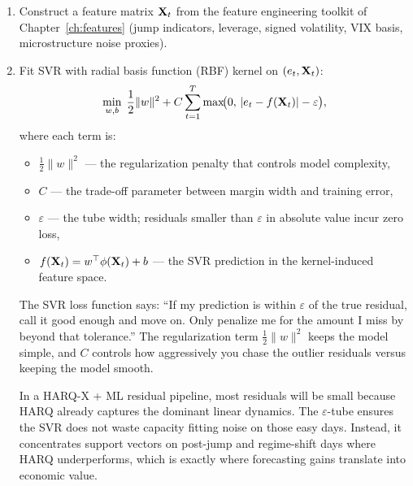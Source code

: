 \begin{enumerate}
  \item Construct a feature matrix $\mathbf{X}_t$ from the feature engineering
        toolkit of Chapter~\ref{ch:features} (jump indicators, leverage,
        signed volatility, VIX basis, microstructure noise proxies).
  \item Fit SVR with radial basis function (RBF) kernel on $(e_t, \mathbf{X}_t)$:
        \begin{equation}\label{eq:svr-loss}
          \min_{w,b}\;\frac{1}{2}\|w\|^2
            + C\sum_{t=1}^{T}\max\!\bigl(0,\,|e_t - f(\mathbf{X}_t)| - \varepsilon\bigr),
        \end{equation}
        where each term is:
        \begin{itemize}
          \item $\frac{1}{2}\|w\|^2$ --- the regularization penalty that
                controls model complexity,
          \item $C$ --- the trade-off parameter between margin width and
                training error,
          \item $\varepsilon$ --- the tube width; residuals smaller than
                $\varepsilon$ in absolute value incur zero loss,
          \item $f(\mathbf{X}_t) = w^\top \phi(\mathbf{X}_t) + b$ --- the SVR prediction
                in the kernel-induced feature space.
        \end{itemize}

        \begin{intuition}
        The SVR loss function says: ``If my prediction is within
        $\varepsilon$ of the true residual, call it good enough and move
        on.  Only penalize me for the amount I miss by beyond that
        tolerance.''  The regularization term $\frac{1}{2}\|w\|^2$ keeps
        the model simple, and $C$ controls how aggressively you chase
        the outlier residuals versus keeping the model smooth.
        \end{intuition}

        \begin{projectconnection}
        In a HARQ-X + ML residual pipeline, most residuals will be small
        because HARQ already captures the dominant linear dynamics.  The
        $\varepsilon$-tube ensures the SVR does not waste capacity fitting
        noise on those easy days.  Instead, it concentrates support
        vectors on post-jump and regime-shift days where HARQ
        underperforms, which is exactly where forecasting gains translate
        into economic value.
        \end{projectconnection}


\end{enumerate}
